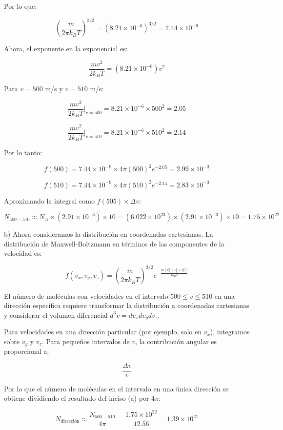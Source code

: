 \documentclass{elsarticle}
\begin{document}
\begin{enumerate}
Por lo que:

\[
\left( \frac{m}{2\pi k_B T} \right)^{3/2} = (8.21 \times 10^{-6})^{3/2} = 7.44 \times 10^{-9}
\]

Ahora, el exponente en la exponencial es:

\[
\frac{m v^2}{2 k_B T} = (8.21 \times 10^{-6}) v^2
\]

Para \( v = 500 \) m/s y \( v = 510 \) m/s:

\[
\frac{m v^2}{2 k_B T} \Big|_{v=500} = 8.21 \times 10^{-6} \times 500^2 = 2.05
\]

\[
\frac{m v^2}{2 k_B T} \Big|_{v=510} = 8.21 \times 10^{-6} \times 510^2 = 2.14
\]

Por lo tanto:

\[
f(500) = 7.44 \times 10^{-9} \times 4\pi (500)^2 e^{-2.05} = 2.99 \times 10^{-3}
\]

\[
f(510) = 7.44 \times 10^{-9} \times 4\pi (510)^2 e^{-2.14} = 2.83 \times 10^{-3}
\]

Aproximando la integral como \( f(505) \times \Delta v \):

\[
N_{500-510} \approx N_A \times (2.91 \times 10^{-3}) \times 10 = (6.022 \times 10^{23}) \times (2.91 \times 10^{-3}) \times 10 = 1.75 \times 10^{22}
\]

b) Ahora consideramos la distribución en coordenadas cartesianas. La distribución de Maxwell-Boltzmann en términos de las componentes de la velocidad es:

\[
f(v_x, v_y, v_z) = \left( \frac{m}{2\pi k_B T} \right)^{3/2} e^{-\frac{m(v_x^2 + v_y^2 + v_z^2)}{2 k_B T}}
\]

El número de moléculas con velocidades en el intervalo \( 500 \leq v \leq 510 \) en una dirección específica requiere transformar la distribución a coordenadas cartesianas y considerar el volumen diferencial \( d^3v = dv_x dv_y dv_z \).  

Para velocidades en una dirección particular (por ejemplo, solo en \( v_x \)), integramos sobre \( v_y \) y \( v_z \). Para pequeños intervalos de \( v \), la contribución angular es proporcional a:

\[
\frac{\Delta v}{v}
\]

Por lo que el número de moléculas en el intervalo en una única dirección se obtiene dividiendo el resultado del inciso (a) por $4\pi$:

\[
N_{\text{dirección}} \approx \frac{N_{500-510}}{4\pi} = \frac{1.75 \times 10^{22}}{12.56} = 1.39 \times 10^{21}
\]


\end{enumerate}
\end{document}
